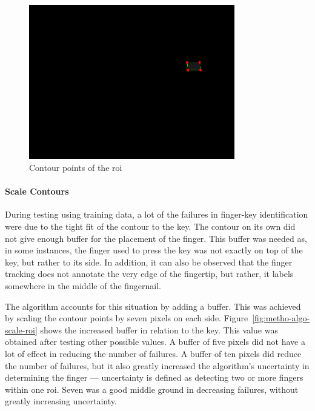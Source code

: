 \documentclass{report}
\begin{document}
\begin{figure}[H]
	\centering
	\includegraphics[width=0.8\textwidth]{key-contour.png}
	\caption{Contour points of the \ac{roi}}
	\label{fig:metho-algo-contour-key}
	\centering
\end{figure}

\paragraph{Scale Contours}
During testing using training data, a lot of the failures in finger-key
identification were due to the tight fit of the contour to the key. The contour
on its own did not give enough buffer for the placement of the finger. This
buffer was needed as, in some instances, the finger used to press the key was
not exactly on top of the key, but rather to its side. In addition, it can also
be observed that the finger tracking does not annotate the very edge of the
fingertip, but rather, it labels somewhere in the middle of the fingernail.

The algorithm accounts for this situation by adding a buffer. This was achieved
by scaling the contour points by seven pixels on each side.
Figure~\ref{fig:metho-algo-scale-roi} shows the increased buffer in relation to
the key. This value was obtained after testing other possible values. A buffer
of five pixels did not have a lot of effect in reducing the number of failures.
A buffer of ten pixels did reduce the number of failures, but it also greatly
increased the algorithm's uncertainty in determining the finger --- uncertainty
is defined as detecting two or more fingers within one \ac{roi}. Seven was a
good middle ground in decreasing failures, without greatly increasing
uncertainty.
\end{document}
